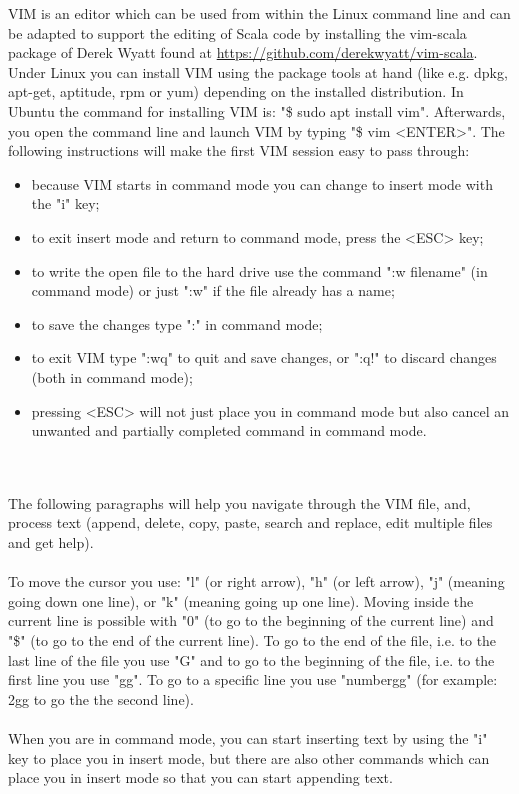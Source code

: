 \documentclass {article}
\begin{document}
VIM is an editor which can be used from within the Linux command line and can be adapted to support the editing of Scala code by installing the vim-scala package of Derek Wyatt found at \href{https://github.com/derekwyatt/vim-scala}{https://github.com/derekwyatt/vim-scala}. 
Under Linux you can install VIM using the package tools at hand (like e.g. dpkg, apt-get, aptitude, rpm or yum) depending on the installed distribution.
 In Ubuntu the command for installing VIM is:  "\$ sudo apt install vim". Afterwards, you open the command line and launch VIM by typing "\$ vim <ENTER>". The following instructions will make the first VIM session easy to pass through:
\begin{itemize}
\item because VIM starts in command mode you can change to insert mode with the "i" key;
\item to exit insert mode and return to command mode, press the <ESC> key;
\item to write the open file to the hard drive use the command ":w filename" (in command mode) or just ":w" if the file already has a name; 
\item to save the changes type ":" in command mode;
\item to exit VIM type ":wq" to quit and save changes, or ":q!" to discard changes (both in command mode);
\item pressing <ESC> will not just place you in command mode but also cancel an unwanted and partially completed command in command mode.
\end{itemize}
\\
\\
The following paragraphs will help you navigate through the VIM file, and, process text (append, delete, copy, paste, search and replace, edit multiple files and get help). 
\\
\\
To move the cursor you use: "l" (or right arrow), "h" (or left arrow), "j" (meaning going down one line), or "k" (meaning going up one line). 
Moving inside the current line is possible with "0" (to go to the beginning of the current line) and "\$" (to go to the end of the current line). 
To go to the end of the file, i.e. to the last line of the file you use "G" and to go to the beginning of the file, i.e. to the first line you use "gg".
 To go to a specific line you use "numbergg" (for example: 2gg to go the the second line).
\\
\\
When you are in command mode, you can start inserting text by using the "i" key to place you in insert mode, but there are also other commands which can place you in insert mode so that you can start appending text. 
\end{document}
